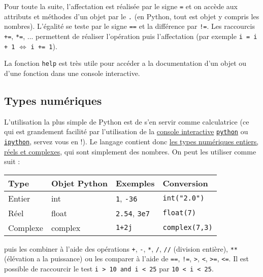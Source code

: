 \documentclass{article}
\begin{document}
Pour toute la suite, l'affectation est réalisée par le signe \texttt{=} et on accède aux attributs et méthodes d'un objet par le \texttt{.} (en Python, tout est objet y compris les nombres). L'égalité se teste par le signe \texttt{==} et la différence par \texttt{!=}. Les raccourcis \texttt{+=}, \texttt{*=}, ... permettent de réaliser l'opération puis l'affectation (par exemple \texttt{i = i + 1} $\Leftrightarrow$ \texttt{i += 1}).

La fonction \texttt{help} est très utile pour accéder a la documentation d'un objet ou d'une fonction dans une console interactive.

\subsection*{Types numériques}
L'utilisation la plus simple de Python est de s'en servir comme calculatrice (ce qui est grandement facilité par l'utilisation de la \href{https://fr.wikipedia.org/wiki/Interface_en_ligne_de_commande}{console interactive} \href{https://docs.python.org/fr/3.7/tutorial/interpreter.html}{\texttt{python}} ou \href{https://ipython.readthedocs.io/en/stable/}{\texttt{ipython}}, servez vous en !). Le langage contient donc \href{https://fr.wikibooks.org/wiki/Programmation_Python/Num\%C3\%A9riques}{les types numériques entiers, réels et complexes}, qui sont simplement des nombres. On peut les utiliser comme suit :

\begin{tabular}{|l|l|l|l|}
    \hline
    Type                    & Objet Python      & Exemples                      & Conversion\\
    \hline
    Entier                  & int               & \texttt{1}, \texttt{-36}      & \texttt{int("2.0")}\\
    Réel                    & float             & \texttt{2.54}, \texttt{3e7}   & \texttt{float(7)}\\
    Complexe                & complex           & \texttt{1+2j}                 & \texttt{complex(7,3)}\\
    \hline
\end{tabular}

puis les combiner à l'aide des opérations \texttt{+}, \texttt{-}, \texttt{*}, \texttt{/}, \texttt{//} (division entière), \texttt{**} (élévation a la puissance) ou les comparer à l'aide de \texttt{==}, \texttt{!=}, \texttt{>}, \texttt{<}, \texttt{>=}, \texttt{<=}. Il est possible de raccourcir le test \texttt{i > 10 and i < 25} par \texttt{10 < i < 25}.
\end{document}
